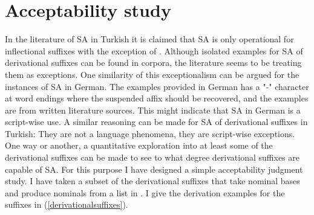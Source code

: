 




\section{Acceptability study}

In the literature of SA in Turkish it is claimed that SA is only operational for inflectional suffixes \citep{orgun1995flat,kornfilt1996some,broadwell2008turkish, kornfilt2012revisiting} with the exception of \cite{akkucs2016suspended}. Although isolated examples for SA of derivational suffixes can be found in corpora, the literature seems to be treating them as exceptions. One similarity of this exceptionalism can be argued for the instances of SA in German. The examples provided in German \citep{pounder2006broken} has a "-" character at word endings where the suspended affix should be recovered, and the examples are from written literature sources. This might indicate that SA in German is a script-wise use. A similar reasoning can be made for SA of derivational suffixes in Turkish: They are not a language phenomena, they are script-wise exceptions. One way or another, a quantitative exploration into at least some of the derivational suffixes can be made to see to what degree derivational suffixes are capable of SA. For this purpose I have designed a simple acceptability judgment study.
I have taken a subset of the derivational suffixes that take nominal bases and produce nominals from a list in \cite{goksel2004turkish}. I give the derivation examples for the suffixes in (\ref{derivationalsuffixes}).


